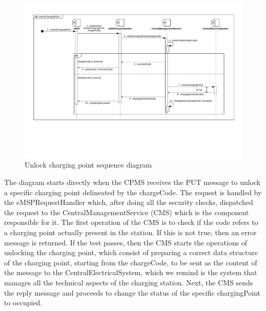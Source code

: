 \begin{figure}[H]
    \centering
    \includegraphics[trim={0 5cm 0 1cm},clip, width=1\textwidth]{Images/cp2/runtime/ChargeNow_cpms_view.pdf}
    \caption{Unlock charging point sequence diagram}
\end{figure}
The diagram starts directly when the CPMS receives the PUT message to unlock a specific charging point delineated by the chargeCode. The request is handled by the eMSPRequestHandler which, after doing all the security checks, dispatched the request to the CentralManagementService (CMS) which is the component responsible for it. The first operation of the CMS is to check if the code refers to a charging point actually present in the station. If this is not true, then an error message is returned. If the test passes, then the CMS starts the operations of unlocking the charging point, which consist of preparing a correct data structure of the charging point, starting from the chargeCode, to be sent as the content of the message to the CentralElectricalSystem, which we remind is  the system that manages all the technical aspects of the charging station. Next, the CMS sends the reply message and proceeds to change the status of the specific chargingPoint to occupied. 


